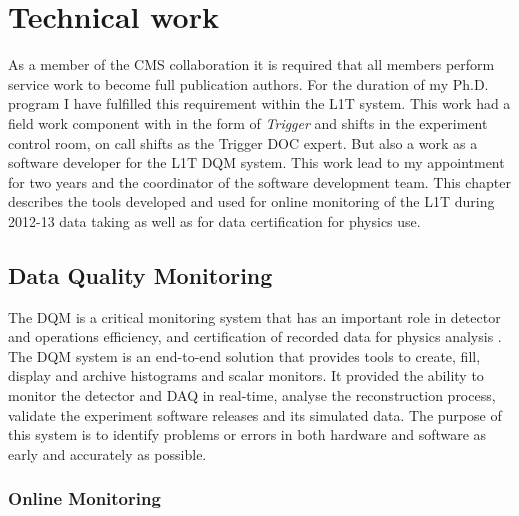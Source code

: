 \chapter{Technical work}
\label{CHAPTER:TechnicalWork}

\glsresetall %


As a member of the \gls{CMS} collaboration it is required that all members perform service work to become full publication authors. For the duration of my Ph.D. program I have fulfilled this requirement within the \gls{L1T} system. This work had a field work component with in the form of \textit{Trigger} and  shifts in the experiment control room, on call shifts as the Trigger \gls{DOC} expert. But also a work as a software developer for the \gls{L1T} \gls{DQM} system. This work lead to my appointment for two years and the coordinator of the software development team. This chapter describes the tools developed and used for online monitoring of the \gls{L1T} during 2012-13 data taking as well as for data certification for physics use.

\section{Data Quality Monitoring}


The \acrfull{DQM} is a critical monitoring system that has an important role in detector and operations efficiency, and certification of recorded data for physics analysis \cite{CMSTDR:CMSTridasTDRVol1,ARTICLE:CMSDataQualityMonitoringSoftWare_ExperienceAndFuture}. The \gls{DQM} system is an end-to-end solution that provides tools to create, fill, display and archive histograms and scalar monitors. It provided the ability to monitor the detector and \gls{DAQ} in real-time, analyse the reconstruction process, validate the experiment software releases and its simulated data. The purpose of this system is to identify problems or errors in both hardware and software as early and accurately as possible.

\subsection{Online Monitoring}


